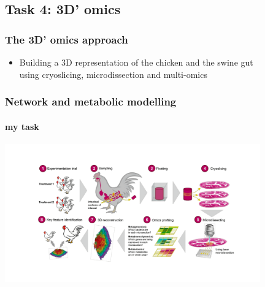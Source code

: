 \documentclass{beamer}
\begin{document}







   \begin{darkframes}
      \section{
      Task 4: 3D' omics
      }
      \begin{frame}
         \frametitle{The 3D' omics approach}
         \begin{itemize}
            \item Building a 3D representation of the chicken and the swine gut \\
                  using cryoslicing, microdissection and multi-omics 
         \end{itemize}
      \end{frame}
   \end{darkframes}


   \begin{frame}
      \frametitle{Network and metabolic modelling}
      \framesubtitle{my task}
      \includegraphics[width=110mm]{resources/3domics-wf.png}
   \end{frame}



\end{document}
